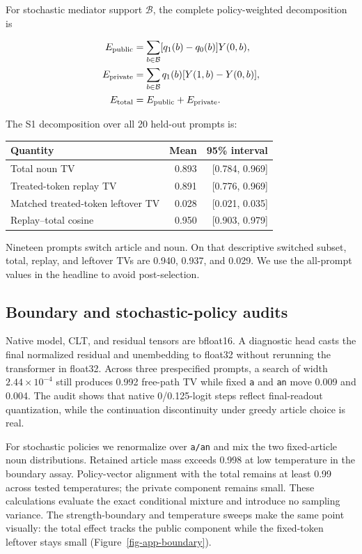 \documentclass[
]{article}
\newcounter{none} %
\begin{document}
For stochastic mediator support \(\mathcal B\), the complete
policy-weighted decomposition is

\[
\begin{aligned}
E_{\rm public}&=\sum_{b\in\mathcal B}[q_1(b)-q_0(b)]Y(0,b),\\
E_{\rm private}&=\sum_{b\in\mathcal B}q_1(b)[Y(1,b)-Y(0,b)],\\
E_{\rm total}&=E_{\rm public}+E_{\rm private}.
\end{aligned}
\]

The S1 decomposition over all 20 held-out prompts is:

{\def\LTcaptype{none} %
\begin{longtable}[]{@{}lrr@{}}
\toprule\noalign{}
Quantity & Mean & 95\% interval \\
\midrule\noalign{}
\endhead
\bottomrule\noalign{}
\endlastfoot
Total noun TV & 0.893 & {[}0.784, 0.969{]} \\
Treated-token replay TV & 0.891 & {[}0.776, 0.969{]} \\
Matched treated-token leftover TV & 0.028 & {[}0.021, 0.035{]} \\
Replay--total cosine & 0.950 & {[}0.903, 0.979{]} \\
\end{longtable}
}

Nineteen prompts switch article and noun. On that descriptive switched
subset, total, replay, and leftover TVs are 0.940, 0.937, and 0.029. We
use the all-prompt values in the headline to avoid post-selection.

\subsection{Boundary and stochastic-policy
audits}\label{boundary-and-stochastic-policy-audits}

Native model, CLT, and residual tensors are bfloat16. A diagnostic head
casts the final normalized residual and unembedding to float32 without
rerunning the transformer in float32. Across three prespecified prompts,
a search of width \(2.44\times10^{-4}\) still produces 0.992 free-path
TV while fixed \texttt{a} and \texttt{an} move 0.009 and 0.004. The
audit shows that native 0/0.125-logit steps reflect final-readout
quantization, while the continuation discontinuity under greedy article
choice is real.

For stochastic policies we renormalize over \texttt{a/an} and mix the
two fixed-article noun distributions. Retained article mass exceeds
0.998 at low temperature in the boundary assay. Policy-vector alignment
with the total remains at least 0.99 across tested temperatures; the
private component remains small. These calculations evaluate the exact
conditional mixture and introduce no sampling variance. The
strength-boundary and temperature sweeps make the same point visually:
the total effect tracks the public component while the fixed-token
leftover stays small (Figure~\ref{fig-app-boundary}).
\end{document}
